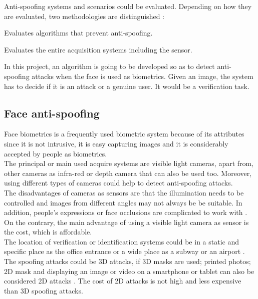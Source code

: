Anti-spoofing systems and scenarios could be evaluated. Depending on how they are evaluated, two methodologies are distinguished \cite{Spoofing_survey}:
\begin{description}[itemsep=2pt,topsep=8pt,parsep=0pt,partopsep=20pt]
\item[Algorithm-based or technology evaluation:] Evaluates algorithms that prevent anti-spoofing.
\item[System-based or scenario evaluation:] Evaluates the entire acquisition systems including the sensor.
\end{description}

In this project,  an algorithm is going to be developed so as to detect anti-spoofing attacks when the face is used as biometrics. Given an image, the system has to decide if it is an attack or a genuine user. It would be a verification task.

\subsection{Face anti-spoofing}
Face biometrics is a frequently used biometric system because of its attributes since it is not intrusive, it is easy capturing images and it is considerably accepted by people as biometrics. \\

The principal or main used acquire systems are visible light cameras, apart from, other cameras as infra-red or depth camera that can also be used too. Moreover, using different types of cameras could help to detect anti-spoofing attacks.\\

The disadvantages of cameras as sensors are that the illumination needs to be controlled and images from different angles may not always be be suitable. In addition, people’s expressions or face occlusions are complicated to work with \cite{survey2,2d_3d_face}. On the contrary, the main advantage of using a visible light camera as sensor is the cost, which is affordable. \\

The location of verification or identification systems could be in a static and specific place as the office entrance or a wide place as a subway or an airport \cite{survey2}.\\

The spoofing attacks could be 3D attacks, if 3D masks are used; printed photos; 2D mask and displaying an image or video on a smartphone or tablet can also be considered 2D attacks \cite{2d_3d_face}. The cost of 2D attacks is not high \cite{distorsion} and less expensive than 3D spoofing attacks.\\


